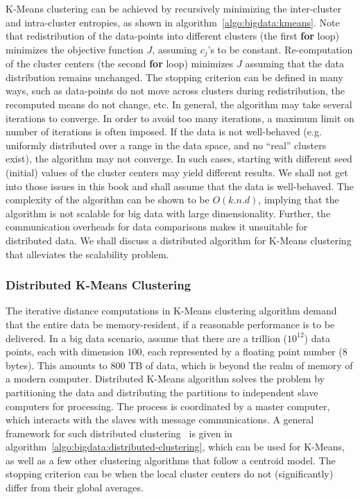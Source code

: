 K-Means clustering can be achieved by recursively minimizing the inter-cluster and intra-cluster entropies, as shown in 
algorithm~\ref{algo:bigdata:kmeans}. 
Note that redistribution of the data-points into different clusters (the first {\bf for} loop) minimizes the objective function $J$, 
assuming $c_j$'s to be constant. Re-computation of the cluster centers (the second {\bf for} loop) minimizes $J$ assuming that the
data distribution remains unchanged. 
The stopping criterion can be defined in many ways, such as data-points do not move across clusters during redistribution, the
recomputed means do not change, etc. 
%
In general, the algorithm may take several iterations to converge. In order to avoid too many iterations, a maximum limit on number of 
iterations is often imposed.  If the data is not well-behaved (e.g. uniformly distributed over a range in the data space, and no ``real'' 
clusters exist), the algorithm may not converge. In such cases, starting with different seed (initial) values of the cluster centers may 
yield different results. We shall not get into those issues in this book and shall assume that the data is well-behaved.
%
The complexity of the algorithm can be shown to be $O(k.n.d)$, implying that the algorithm is not scalable for big data with large
dimensionality. Further, the communication overheads for data comparisons makes it unsuitable for distributed data. 
We shall discuss a distributed algorithm for K-Means clustering that alleviates the scalability problem.

\subsubsection*{Distributed K-Means Clustering}
\label{sec:bigdata:d-kmeans}

The iterative distance computations in K-Means clustering algorithm demand that the entire data be memory-resident, if a reasonable
performance is to be delivered. In a big data scenario, assume that there are a trillion ($10^{12}$) data points, each with dimension 
$100$, each represented by a floating point number ($8$ bytes). This amounts to $800$ TB of data, which is beyond the realm of 
memory of a modern computer.
%
Distributed K-Means algorithm solves the problem by partitioning the data and distributing the partitions to independent slave computers
for processing. The process is coordinated by a master computer, which interacts with the slaves with message communications.
A general framework for such distributed clustering~\citep{Forman:2000} is given in algorithm~\ref{algo:bigdata:distributed-clustering},
which can be used for K-Means, as well as a few other clustering algorithms that follow a centroid model. The stopping criterion can 
be when the local cluster centers do not (significantly) differ from their global averages.

